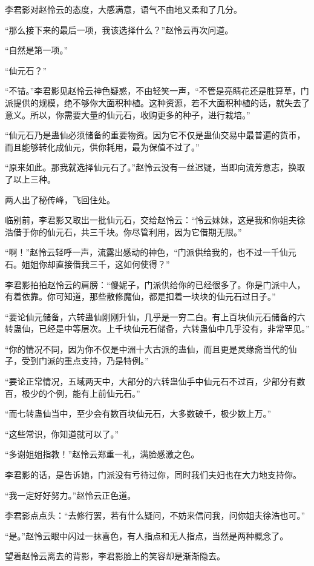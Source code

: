 \begin{this_body}
李君影对赵怜云的态度，大感满意，语气不由地又柔和了几分。

“那么接下来的最后一项，我该选择什么？”赵怜云再次问道。

“自然是第一项。”

“仙元石？”

“不错。”李君影见赵怜云神色疑惑，不由轻笑一声，“不管是亮睛花还是胜算草，门派提供的规模，绝不够你大面积种植。这种资源，若不大面积种植的话，就失去了意义。所以，你需要大量的仙元石，收购更多的种子，进行栽培。”

“仙元石乃是蛊仙必须储备的重要物资。因为它不仅是蛊仙交易中最普遍的货币，而且能够转化成仙元，供你耗用，最为保值不过了。”

“原来如此。那我就选择仙元石了。”赵怜云没有一丝迟疑，当即向流芳意志，换取了以上三种。

两人出了秘传峰，飞回住处。

临别前，李君影又取出一批仙元石，交给赵怜云：“怜云妹妹，这是我和你姐夫徐浩借于你的仙元石，共三千块。你尽管利用，因为它借期无限。”

“啊！”赵怜云轻呼一声，流露出感动的神色，“门派供给我的，也不过一千仙元石。姐姐你却直接借我三千，这如何使得？”

李君影拍拍赵怜云的肩膀：“傻妮子，门派供给你的已经很多了。你是门派中人，有着依靠。你可知道，那些散修魔仙，都是扣着一块块的仙元石过日子。”

“要论仙元储备，六转蛊仙刚刚升仙，几乎是一穷二白。有上百块仙元石储备的六转蛊仙，已经是中等层次。上千块仙元石储备，六转蛊仙中几乎没有，非常罕见。”

“你的情况不同，因为你不仅是中洲十大古派的蛊仙，而且更是灵缘斋当代的仙子，受到门派的重点支持，乃是特例。”

“要论正常情况，五域两天中，大部分的六转蛊仙手中仙元石不过百，少部分有数百，极少的个例，能有上前仙元石。”

“而七转蛊仙当中，至少会有数百块仙元石，大多数破千，极少数上万。”

“这些常识，你知道就可以了。”

“多谢姐姐指教！”赵怜云郑重一礼，满脸感激之色。

李君影的话，是告诉她，门派没有亏待过你，同时我们夫妇也在大力地支持你。

“我一定好好努力。”赵怜云正色道。

李君影点点头：“去修行罢，若有什么疑问，不妨来信问我，问你姐夫徐浩也可。”

“是。”赵怜云眼中闪过一抹喜色，有人指点和无人指点，当然是两种概念了。

望着赵怜云离去的背影，李君影脸上的笑容却是渐渐隐去。


\end{this_body}
